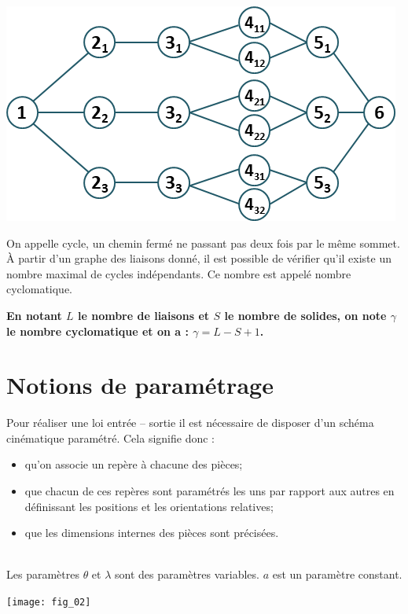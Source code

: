 \begin{defi}
\begin{multicols}{3}
\begin{center}

\vspace{-.2cm}

\includegraphics[width=.8\linewidth]{images/haptique_02}
\end{center}

\end{multicols}

On appelle cycle, un chemin fermé ne passant pas deux fois par le même sommet.
À partir d’un graphe des liaisons donné, il est possible de vérifier qu’il existe un nombre
maximal de cycles indépendants. Ce nombre est appelé nombre cyclomatique. 

\textbf{En notant $L$ le nombre de liaisons et $S$ le nombre de solides, on note $\gamma$ le nombre cyclomatique et on a : $\gamma = L - S + 1$.}
\end{defi}


\section{Notions de paramétrage}
Pour réaliser une loi entrée -- sortie il est nécessaire de disposer d'un schéma cinématique paramétré. Cela signifie donc :
\begin{itemize}
\item qu'on associe un repère à chacune des pièces;
\item que chacun de ces repères sont paramétrés les uns par rapport aux autres en définissant les positions et les orientations relatives;
\item que les dimensions internes des pièces sont précisées. 
\end{itemize}

\begin{exemple}~\\ Les paramètres $\theta$ et $\lambda$ sont des paramètres variables. $a$ est un paramètre constant. 
\begin{center}
\texttt{[image: fig\_02]}
\end{center}
\end{exemple}
